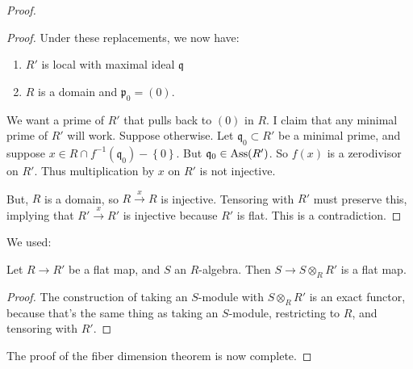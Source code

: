 \begin{proof}
\begin{proof}
Under these replacements, we now have:
\begin{enumerate}
\item $R'$ is local with maximal ideal $\mathfrak{q}$ 
\item $R$ is a domain and $\mathfrak{p}_0 = (0)$.
\end{enumerate}
We want a prime of $R'$ that pulls back to $(0)$ in $R$. I claim that any
minimal prime of $R'$ will work. 
Suppose otherwise. Let $\mathfrak{q}_0 \subset R'$ be a minimal prime, and
suppose $x \in R \cap f^{-1}(\mathfrak{q}_0) - \left\{0\right\}$. But
$\mathfrak{q}_0 \in \mathrm{Ass}(R')$. So $f(x)$ is
a zerodivisor on $R'$. Thus multiplication by $x$ on $R'$ is not injective. 

But, $R$ is a domain, so $R \stackrel{x}{\to} R$ is injective. Tensoring with
$R'$ must preserve this, implying that $R' \stackrel{x}{\to} R'$ is injective
because $R'$ is flat. This is a contradiction.
\end{proof} 

We used:
\begin{lemma} 
Let $R \to R'$ be a flat map, and $S$ an $R$-algebra. Then $S \to S \otimes_R
R'$ is a flat map.
\end{lemma} 
\begin{proof} 
The construction of taking an $S$-module with $S \otimes_R R'$ is an exact
functor, because that's the same thing as taking an $S$-module, restricting to
$R$, and tensoring with $R'$.
\end{proof} 
The proof of the fiber dimension theorem is now complete.

\end{proof} 



